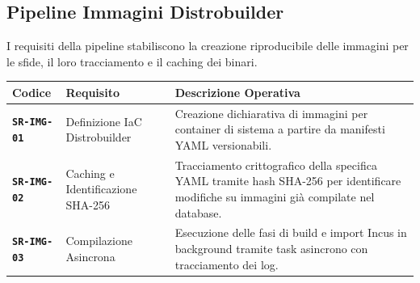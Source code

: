 \subsection{Pipeline Immagini
Distrobuilder}\label{pipeline-immagini-distrobuilder}

I requisiti della pipeline stabiliscono la creazione riproducibile delle
immagini per le sfide, il loro tracciamento e il caching dei binari.

\begin{longtable}[]{@{}
  >{\raggedright\arraybackslash}p{}
  >{\raggedright\arraybackslash}p{}
  >{\raggedright\arraybackslash}p{}@{}}
\toprule\noalign{}
\begin{minipage}[b]{\linewidth}\raggedright
Codice
\end{minipage} & \begin{minipage}[b]{\linewidth}\raggedright
Requisito
\end{minipage} & \begin{minipage}[b]{\linewidth}\raggedright
Descrizione Operativa
\end{minipage} \\
\midrule\noalign{}
\endhead
\bottomrule\noalign{}
\endlastfoot
\textbf{\passthrough{\lstinline!SR-IMG-01!}} & Definizione IaC
Distrobuilder & Creazione dichiarativa di immagini per container di
sistema a partire da manifesti YAML versionabili. \\
\textbf{\passthrough{\lstinline!SR-IMG-02!}} & Caching e Identificazione
SHA-256 & Tracciamento crittografico della specifica YAML tramite hash
SHA-256 per identificare modifiche su immagini già compilate nel
database. \\
\textbf{\passthrough{\lstinline!SR-IMG-03!}} & Compilazione Asincrona &
Esecuzione delle fasi di build e import Incus in background tramite task
asincrono con tracciamento dei log. \\
\end{longtable}
